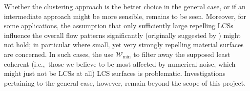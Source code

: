 Whether the clustering approach is the better choice in the general case, or if
an intermediate approach might be more sensible, remains to be seen. Moreover,
for some applications, the assumption that only sufficiently large repelling
LCSs influence the overall flow patterns significantly (originally suggested
by \textcite{farazmand2012computing}) might not hold; in particular where
small, yet very strongly repelling material surfaces are concerned. In such
cases, the use $\mathcal{W}_{\min}$ to filter away the supposed least coherent
(i.e.,\ those we believe to be most affected by numerical noise, which might
just not be LCSs at all) LCS surfaces is problematic.
Investigations pertaining to the general case, however, remain beyond the scope
of this project.
